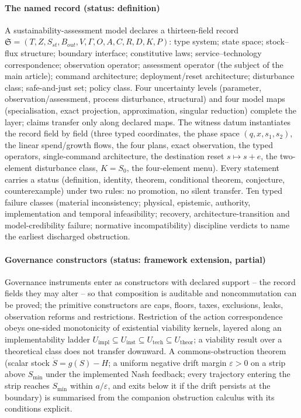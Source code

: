 \paragraph{The named record (status: definition)} A sustainability-assessment model declares a thirteen-field record $\mathfrak S=(T,Z,S_{st},B_{out},V,\Gamma,O,A,C,R,D,K,P)$: type system; state space; stock--flux structure; boundary interface; constitutive laws; service--technology correspondence; observation operator; assessment operator (the subject of the main article); command architecture; deployment/reset architecture; disturbance class; safe-and-just set; policy class. Four uncertainty levels (parameter, observation/assessment, process disturbance, structural) and four model maps (specialisation, exact projection, approximation, singular reduction) complete the layer; claims transfer only along declared maps. The witness datum instantiates the record field by field (three typed coordinates, the phase space $(q,x,s_1,s_2)$, the linear spend/growth flows, the four plans, exact observation, the typed operators, single-command architecture, the destination reset $s\mapsto s+e$, the two-element disturbance class, $K=S_0$, the four-element menu). Every statement carries a status (definition, identity, theorem, conditional theorem, conjecture, counterexample) under two rules: no promotion, no silent transfer. Ten typed failure classes (material inconsistency; physical, epistemic, authority, implementation and temporal infeasibility; recovery, architecture-transition and model-credibility failure; normative incompatibility) discipline verdicts to name the earliest discharged obstruction.

\paragraph{Governance constructors (status: framework extension, partial)} Governance instruments enter as constructors with declared support -- the record fields they may alter -- so that composition is auditable and noncommutation can be proved; the primitive constructors are caps, floors, taxes, exclusions, leaks, observation reforms and restrictions. Restriction of the action correspondence obeys one-sided monotonicity of existential viability kernels, layered along an implementability ladder $U_{\mathrm{impl}}\subseteq U_{\mathrm{inst}}\subseteq U_{\mathrm{tech}}\subseteq U_{\mathrm{theor}}$; a viability result over a theoretical class does not transfer downward. A commons-obstruction theorem (scalar stock $\dot S=g(S)-H$; a uniform negative drift margin $\varepsilon>0$ on a strip above $S_{\min}$ under the implemented Nash feedback; every trajectory entering the strip reaches $S_{\min}$ within $a/\varepsilon$, and exits below it if the drift persists at the boundary) is summarised from the companion obstruction calculus with its conditions explicit.

